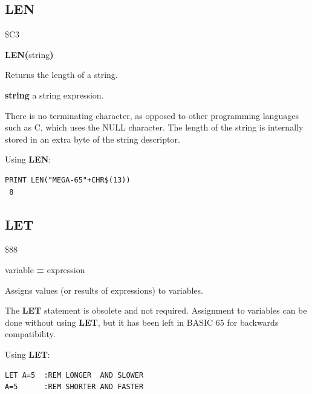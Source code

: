 
\newpage
\subsection{LEN}
\begin{description}[leftmargin=2cm,style=nextline]
\item [Token:] \$C3
\item [Format:] {\bf LEN(}string{\bf)}
\item [Usage:] Returns the length of a string.

               {\bf string} a string expression.

\item [Remarks:] There is no terminating character, as opposed to
                 other programming languages such as C, which uses
                 the NULL character. The length of
                 the string is internally stored in an extra byte of
                 the string descriptor.

\item [Example:] Using {\bf LEN}:
\begin{tcolorbox}[colback=black,coltext=white]
\verbatimfont{\codefont}
\begin{verbatim}
PRINT LEN("MEGA-65"+CHR$(13))
 8
\end{verbatim}
\end{tcolorbox}
\end{description}


\newpage
\subsection{LET}
\begin{description}[leftmargin=2cm,style=nextline]
\item [Token:] \$88
\item [Format:] [{\bf LET}] variable {\bf=} expression
\item [Usage:] Assigns values (or results of expressions) to variables.
\item [Remarks:] The {\bf LET} statement is obsolete and not required.
               Assignment to variables can be done without using
               {\bf LET}, but it has been left in BASIC 65 for backwards compatibility.

\item [Examples:] Using {\bf LET}:
\begin{tcolorbox}[colback=black,coltext=white]
\verbatimfont{\codefont}
\begin{verbatim}
LET A=5  :REM LONGER  AND SLOWER
A=5      :REM SHORTER AND FASTER
\end{verbatim}
\end{tcolorbox}
\end{description}


